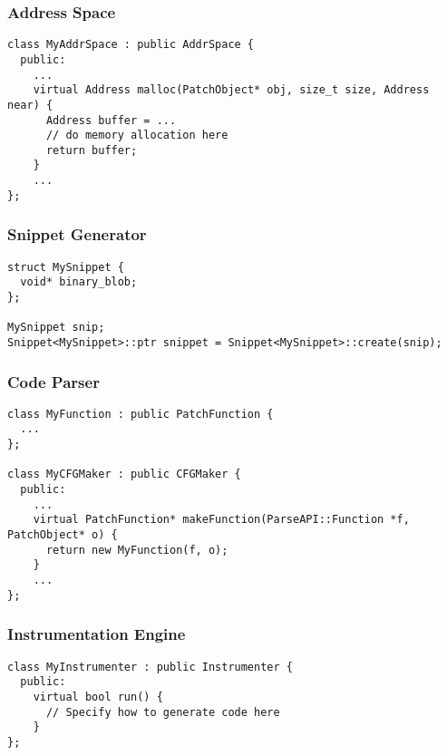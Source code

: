 \subsubsection{Address Space}
\lstset{numbers=left}
\begin{lstlisting}
class MyAddrSpace : public AddrSpace {
  public:
    ...
    virtual Address malloc(PatchObject* obj, size_t size, Address near) {
      Address buffer = ...
      // do memory allocation here
      return buffer;
    }
    ...
};

\end{lstlisting}

\subsubsection{Snippet Generator}
\lstset{numbers=left}
\begin{lstlisting}
struct MySnippet {
  void* binary_blob;
};

MySnippet snip;
Snippet<MySnippet>::ptr snippet = Snippet<MySnippet>::create(snip);
\end{lstlisting}

\subsubsection{Code Parser}
\lstset{numbers=left}
\begin{lstlisting}
class MyFunction : public PatchFunction {
  ...
};

class MyCFGMaker : public CFGMaker {
  public:
    ...
    virtual PatchFunction* makeFunction(ParseAPI::Function *f, PatchObject* o) {
      return new MyFunction(f, o);
    }
    ...
};
\end{lstlisting}

\subsubsection{Instrumentation Engine}
\lstset{numbers=left}
\begin{lstlisting}
class MyInstrumenter : public Instrumenter {
  public:
    virtual bool run() {
      // Specify how to generate code here
    }
};
\end{lstlisting}

